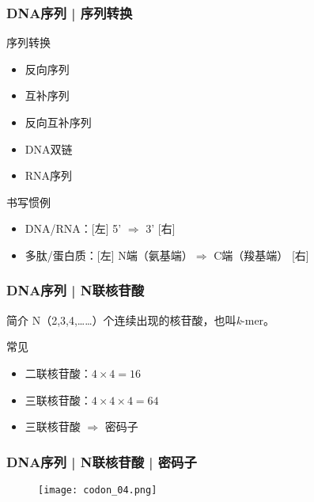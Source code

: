 \begin{frame}
  \frametitle{DNA序列 | 序列转换}
  \begin{block}{序列转换}
    \begin{itemize}
      \item 反向序列
      \item 互补序列
      \item 反向互补序列
      \item DNA双链
      \item RNA序列
    \end{itemize}
  \end{block}
  \pause
  \begin{block}{书写惯例}
    \begin{itemize}
      \item DNA/RNA：[左] 5' $\Longrightarrow$ 3' [右]
      \item 多肽/蛋白质：[左] N端（氨基端）$\Longrightarrow$ C端（羧基端） [右]
    \end{itemize}
  \end{block}
\end{frame}

\begin{frame}
  \frametitle{DNA序列 | N联核苷酸}
  \begin{block}{简介}
    N（2,3,4,……）个连续出现的核苷酸，也叫\textit{k}-mer。
  \end{block}
  \pause
  \begin{block}{常见}
    \begin{itemize}
      \item 二联核苷酸：$4 \times 4 = 16$
      \item 三联核苷酸：$4 \times 4 \times 4 = 64$
      \item 三联核苷酸 $\Longrightarrow$ 密码子
    \end{itemize}
  \end{block}
\end{frame}

\begin{frame}
  \frametitle{DNA序列 | N联核苷酸 | 密码子}
  \begin{figure}
    \centering
    \texttt{[image: codon\_04.png]}
  \end{figure}
\end{frame}

